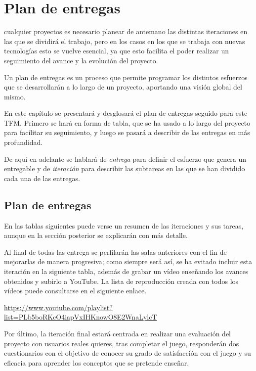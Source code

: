\chapter{Plan de entregas}
\label{chap:plan_entregas}

 cualquier proyectos es necesario planear de antemano las distintas iteraciones en las que se dividirá el trabajo, pero en los casos en los que se trabaja con nuevas tecnologías esto se vuelve esencial, ya que esto facilita el poder realizar un seguimiento del avance y la evolución del proyecto.

Un plan de entregas es un proceso que permite programar los distintos esfuerzos que se desarrollarán a lo largo de un proyecto, aportando  una visión global del mismo.

En este capítulo se presentará y desglosará el plan de entregas seguido para este \acs{TFM}. Primero se hará en forma de tabla, que se ha usado a lo largo del proyecto para facilitar su seguimiento, y luego se pasará a describir de las entregas en más profundidad.

De aquí en adelante se hablará de \textit{entrega} para definir el esfuerzo que genera un entregable y de \textit{iteración} para describir las subtareas en las que se han dividido cada una de las entregas.

\section{Plan de entregas}

En las tablas siguientes puede verse un resumen de las iteraciones y sus tareas, aunque en la sección posterior se explicarán con más detalle.

Al final de todas las entrega se perfilarán las salas anteriores con el fin de mejorarlas de manera progresiva; como siempre será así, se ha evitado incluir esta iteración en la siguiente tabla, además de grabar un vídeo enseñando los avances obtenidos y subirlo a YouTube. La lista de reproducción creada con todos los vídeos puede consultarse en el siguiente enlace.

\begin{center}
    \url{https://www.youtube.com/playlist?list=PLb5boRKcO4iapVxIHKnowO8E2WnaLylcT}
\end{center}

Por último, la iteración final estará centrada en realizar una evaluación del proyecto con usuarios reales quieres, tras completar el juego, responderán dos cuestionarios con el objetivo de conocer su grado de satisfacción con el juego y su eficacia para aprender los conceptos que se pretende enseñar.

